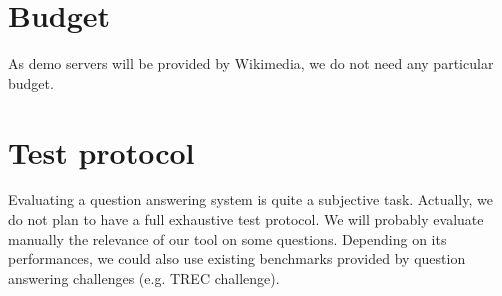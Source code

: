 \documentclass[a4paper,10pt]{article}
\begin{document}
\section{Budget}
As demo servers will be provided by Wikimedia, we do not need any particular budget.

\section{Test protocol}

Evaluating a question answering system is quite a subjective task. Actually, we do not plan to have a full exhaustive test protocol. We will probably evaluate manually the relevance of our tool on some questions. Depending on its performances, we could also use existing benchmarks provided by question answering challenges (e.g. TREC challenge).
\end{document}
